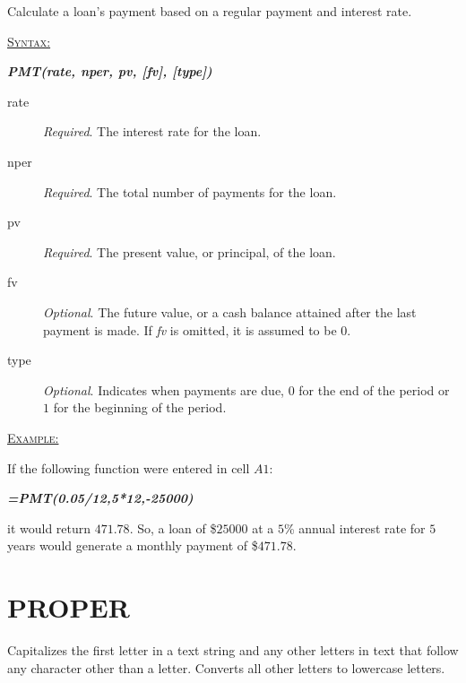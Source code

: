 Calculate a loan's payment based on a regular payment and interest rate.

\begin{addmargin}[1cm]{0cm}
	
	\medskip
	\underline{\textsc{Syntax:}}
	\medskip
	
	{\color{Syntax}
		\noindent\textit{\textbf{PMT(rate, nper, pv, [fv], [type])}}
	}
	
	\begin{description}
		\item[rate] \textit{Required}. The interest rate for the loan.
		\item[nper] \textit{Required}. The total number of payments for the loan.
		\item[pv] \textit{Required}. The present value, or principal, of the loan.
		\item[fv] \textit{Optional}. The future value, or a cash balance attained after the last payment is made. If \textit{fv} is omitted, it is assumed to be $ 0 $.  
		\item[type] \textit{Optional}. Indicates when payments are due, $ 0 $ for the end of the period or $ 1 $ for the beginning of the period.
	\end{description}

	\medskip
	\noindent\underline{\textsc{Example:}}
	\medskip
	
	\noindent If the following function were entered in cell $ A1 $:
	
	{\color{Syntax}
		\textit{\textbf{=PMT(0.05/12,5*12,-25000)}}
	}
	
	\noindent it would return $ 471.78 $. So, a loan of \$$ 25000 $ at a $ 5 $\% annual interest rate for $ 5 $ years would generate a monthly payment of \$$ 471.78 $.

\end{addmargin}

\section{PROPER}

Capitalizes the first letter in a text string and any other letters in text that follow any character other than a letter. Converts all other letters to lowercase letters.

